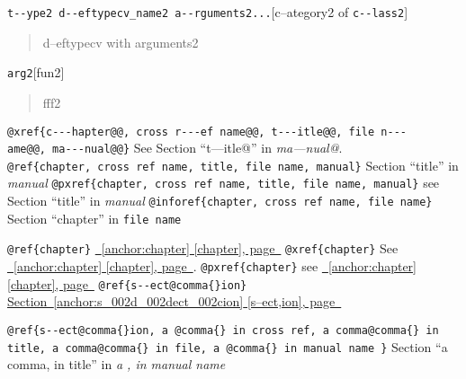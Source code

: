\documentclass{book}
\begin{document}
\begin{titlepage}
\noindent\texttt{t{-}{-}ype2 d{-}{-}eftypecv\_name2 a{-}{-}rguments2...}\hfill[c--ategory2 of \texttt{c{-}{-}lass2}]

%
\begin{quote}
\unskip{\parskip=0pt\noindent}%
d--eftypecv with arguments2
\end{quote}

\noindent\texttt{arg2}\hfill[fun2]

%
\begin{quote}
\unskip{\parskip=0pt\noindent}%
fff2
\end{quote}


\texttt{@xref\{c{-}{-}{-}hapter@@,\ cross r{-}{-}{-}ef name@@,\ t{-}{-}{-}itle@@,\ file n{-}{-}{-}ame@@,\ ma{-}{-}{-}nual@@\}} See Section ``t---itle@'' in \textsl{ma---nual@}.
\texttt{@ref\{chapter,\ cross ref name,\ title,\ file name,\ manual\}} Section ``title'' in \textsl{manual}
\texttt{@pxref\{chapter,\ cross ref name,\ title,\ file name,\ manual\}} see Section ``title'' in \textsl{manual}
\texttt{@inforef\{chapter,\ cross ref name,\ file name\}} Section ``chapter'' in \texttt{file name}

\texttt{@ref\{chapter\}} \hyperref[anchor:chapter]{\chaptername~\ref*{anchor:chapter} [chapter], page~\pageref*{anchor:chapter}}
\texttt{@xref\{chapter\}} See \hyperref[anchor:chapter]{\chaptername~\ref*{anchor:chapter} [chapter], page~\pageref*{anchor:chapter}}.
\texttt{@pxref\{chapter\}} see \hyperref[anchor:chapter]{\chaptername~\ref*{anchor:chapter} [chapter], page~\pageref*{anchor:chapter}}
\texttt{@ref\{s{-}{-}ect@comma\{\}ion\}} \hyperref[anchor:s_002d_002dect_002cion]{Section~\ref*{anchor:s_002d_002dect_002cion} [s--ect,ion], page~\pageref*{anchor:s_002d_002dect_002cion}}

\texttt{@ref\{s{-}{-}ect@comma\{\}ion,\ a @comma\{\} in cross
ref,\ a comma@comma\{\} in title,\ a comma@comma\{\} in file,\ a @comma\{\} in manual name \}}
Section ``a comma, in title'' in \textsl{a , in manual name}


\end{titlepage}
\end{document}
